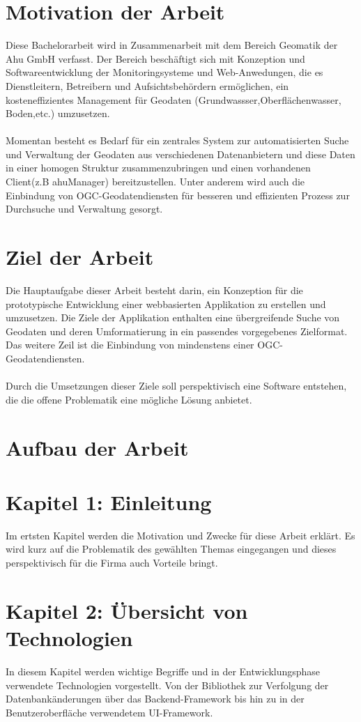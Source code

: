 \documentclass[a4paper,12pt]{scrreprt}
\begin{document}
\section{Motivation der Arbeit}
Diese Bachelorarbeit wird in Zusammenarbeit mit dem Bereich Geomatik der Ahu GmbH verfasst. Der Bereich beschäftigt sich mit Konzeption und Softwareentwicklung der Monitoringsysteme und Web-Anwedungen, die es Dienstleitern, Betreibern und Aufsichtsbehördern ermöglichen, ein kosteneffizientes Management für Geodaten (Grundwassser,Oberflächenwasser, Boden,etc.) umzusetzen. \\ \\
Momentan besteht es Bedarf für ein zentrales System zur automatisierten Suche und Verwaltung der Geodaten aus verschiedenen Datenanbietern und diese Daten in einer homogen Struktur zusammenzubringen und einen vorhandenen Client(z.B ahuManager) bereitzustellen. Unter anderem  wird auch die Einbindung von OGC-Geodatendiensten für besseren und effizienten Prozess zur Durchsuche und Verwaltung gesorgt. 

\section{Ziel der Arbeit}
Die Hauptaufgabe dieser Arbeit besteht darin, ein Konzeption für die prototypische Entwicklung einer webbasierten Applikation zu erstellen und umzusetzen. Die Ziele der Applikation enthalten eine übergreifende Suche von Geodaten und deren Umformatierung in ein passendes vorgegebenes Zielformat. Das weitere Zeil ist die Einbindung von mindenstens einer OGC-Geodatendiensten.\\ \\ Durch die Umsetzungen dieser Ziele soll perspektivisch eine Software entstehen, die die offene Problematik eine mögliche Lösung anbietet.

\section{Aufbau der Arbeit}
\section*{\small \textbf{Kapitel 1: Einleitung}}
Im ertsten Kapitel werden die Motivation und Zwecke für diese Arbeit erklärt. Es wird kurz auf die Problematik des gewählten Themas eingegangen und dieses perspektivisch für die Firma auch Vorteile bringt.

\section*{\small \textbf{Kapitel 2: Übersicht von Technologien}}
In diesem Kapitel werden wichtige Begriffe und in der Entwicklungsphase verwendete Technologien vorgestellt. Von der Bibliothek zur Verfolgung der Datenbankänderungen über das Backend-Framework bis hin zu in der Benutzeroberfläche verwendetem UI-Framework.   
\end{document}

